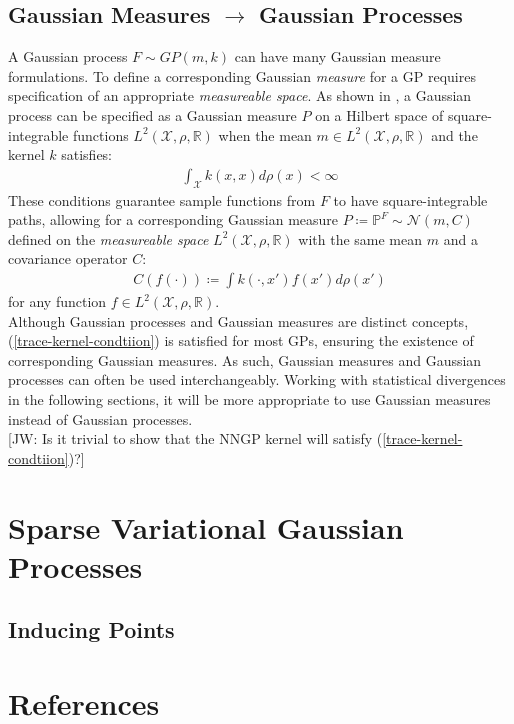 \documentclass[twoside,11pt]{article}
\newcommand{\jw}[1]{{\color{gray} [JW: #1]}}
\begin{document}
\subsection{Gaussian Measures $\rightarrow$ Gaussian Processes \cite{wild2022generalized}}
A Gaussian process $F \sim GP(m, k)$ can have many Gaussian measure formulations. To define a corresponding Gaussian \textit{measure} for a GP requires specification of an appropriate \textit{measureable space}. As shown in \cite{wild2022generalized}, a Gaussian process can be specified as a Gaussian measure $P$ on a Hilbert space of square-integrable functions $L^2(\mathcal{X}, \rho, \mathbb{R})$ when the mean $m \in L^2(\mathcal{X}, \rho, \mathbb{R})$ and the kernel $k$ satisfies:
\begin{align}
    \int_{\mathcal{X}} k(x, x) d\rho(x) < \infty
    \label{trace-kernel-condtiion}
\end{align}
These conditions guarantee sample functions from $F$ to have square-integrable paths, allowing for a corresponding Gaussian measure $P \coloneqq \mathbb{P}^F \sim \mathcal{N}(m, C)$ defined on the \textit{measureable space} $L^2(\mathcal{X}, \rho, \mathbb{R})$ with the same mean $m$ and a covariance operator $C$:
\begin{align}
    C(f(\cdot)) \coloneqq \int k(\cdot, x')f(x')d \rho(x')
    \label{gm-covariance-operator}
\end{align}
for any function $f \in L^2(\mathcal{X}, \rho, \mathbb{R})$. \\
\newline 
Although Gaussian processes and Gaussian measures are distinct concepts, (\ref{trace-kernel-condtiion}) is satisfied for most GPs, ensuring the existence of corresponding Gaussian measures. As such, Gaussian measures and Gaussian processes can often be used interchangeably. Working with statistical divergences in the following sections, it will be more appropriate to use Gaussian measures instead of Gaussian processes.
\\\jw{Is it trivial to show that the NNGP kernel will satisfy (\ref{trace-kernel-condtiion})?}
\section{Sparse Variational Gaussian Processes \cite{wild2023connections}}

\subsection{Inducing Points \cite{terenin2022numerically}}

\begingroup
\let\clearpage\relax
\AtNextBibliography{\small}
\section*{References}
\printbibliography[heading=talikarng, title = {References}]
\endgroup
\end{document}
